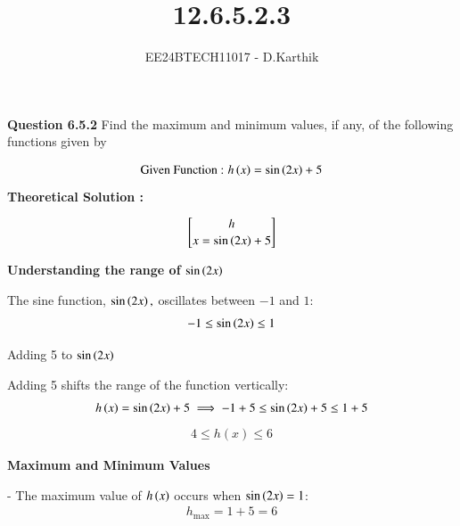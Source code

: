 \documentclass[journal]{IEEEtran}
\begin{document}

\vspace{3cm}

\title{12.6.5.2.3}
\author{EE24BTECH11017 - D.Karthik}
{\let\newpage\relax\maketitle}

\renewcommand{\thefigure}{\theenumi}
\renewcommand{\thetable}{\theenumi}
\setlength{\intextsep}{10pt} %


\renewcommand{\thetable}{\theenumi}

\textbf{Question 6.5.2}
Find the maximum and minimum values, if any, of the following functions
given by

\begin{align}
\text{Given Function :  }
    h\left(x\right) = \sin{\ensuremath{\left(2x\right)}}+5 
\end{align}
\textbf{Theoretical Solution :}


\begin{align}
    h\brack{x} = \sin\left(2x\right) + 5
\end{align}

\textbf{Understanding the range of $ \sin\left(2x\right)$ }

The sine function, $ \sin\left(2x\right),$ oscillates between $-1$ and $1$:
\begin{align}
    -1 \leq \sin\left(2x\right) \leq 1
\end{align}

Adding 5 to $ \sin\left(2x\right) $

Adding 5 shifts the range of the function vertically:
\begin{align}
    h\left(x\right) = \sin\left(2x\right) + 5 \implies -1 + 5 \leq \sin\left(2x\right) + 5 \leq 1 + 5
\end{align}
\begin{align}
    4 \leq h(x) \leq 6
\end{align}

\textbf{ Maximum and Minimum Values}

- The maximum value of $ h\left(x\right)$  occurs when $ \sin\left(2x\right) = 1 $:
\begin{align}
    h_{\text{max}} = 1 + 5 = 6
\end{align}
\end{document}
